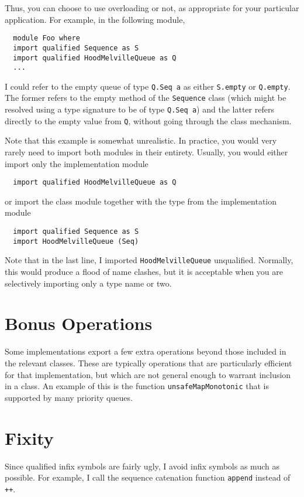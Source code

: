 \documentclass{report}
\newcommand{\cd}{\texttt}
\begin{document}
Thus, you can choose to use overloading or not, as appropriate for your
particular application.  For example, in the following module,
\begin{verbatim}
  module Foo where
  import qualified Sequence as S
  import qualified HoodMelvilleQueue as Q
  ...
\end{verbatim}
I could refer to the empty queue of type \cd{Q.Seq~a} as either
\cd{S.empty} or \cd{Q.empty}.  The former refers to the empty method
of the \cd{Sequence} class (which might be resolved using a type
signature to be of type \cd{Q.Seq~a}) and the latter refers
directly to the empty value from \cd{Q}, without going through the
class mechanism.

Note that this example is somewhat unrealistic.
In practice, you would very rarely need to import both modules
in their entirety.  Usually, you would either import only the implementation
module
\begin{verbatim}
  import qualified HoodMelvilleQueue as Q
\end{verbatim}
or import the class module together with the type from the implementation
module
\begin{verbatim}
  import qualified Sequence as S
  import HoodMelvilleQueue (Seq)
\end{verbatim}
Note that in the last line, I imported \cd{HoodMelvilleQueue}
unqualified.  Normally, this would produce a flood of name clashes,
but it is acceptable when you are selectively importing only a type
name or two.

\section{Bonus Operations}

Some implementations export a few extra operations beyond those included
in the relevant classes.  These are typically operations that are
particularly efficient for that implementation, but which are not general
enough to warrant inclusion in a class.  An example of this is the
function \cd{unsafeMapMonotonic} that is supported by many priority
queues.

\section{Fixity}

Since qualified infix symbols are fairly ugly, I avoid infix symbols
as much as possible.  For example, I call the sequence catenation function
\cd{append} instead of \cd{++}.
\end{document}
